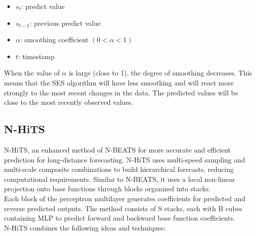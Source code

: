 \documentclass{ieeeojies}
\begin{document}
\begin{itemize}
  \item $s_t$: predict value
  \item $s_{t-1}$: previous predict value
  \item $\alpha$: smoothing coefficient $(0 < \alpha < 1)$
  \item $t$: timestamp
\end{itemize}
When the value of \( \alpha \) is large (close to 1), the degree of smoothing decreases. This means that the SES algorithm will have less smoothing and will react more strongly to the most recent changes in the data. The predicted values will be close to the most recently observed values.

\subsection{N-HiTS}
N-HiTS, an enhanced method of N-BEATS for more accurate and efficient prediction for long-distance forecasting. N-HiTS uses multi-speed sampling and multi-scale composite combinations to build hierarchical forecasts, reducing computational requirements. Similar to N-BEATS, it uses a local non-linear projection onto base functions through blocks organized into stacks. 
\\
Each block of the perceptron multilayer generates coefficients for predicted and reverse predicted outputs. The method consists of S stacks, each with B cubes containing MLP to predict forward and backward base function coefficients. \\
N-HiTS combines the following ideas and techniques:
\end{document}

